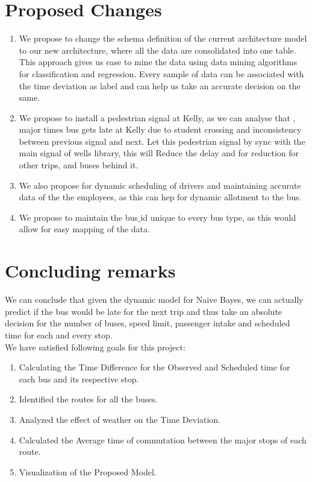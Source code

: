 \documentclass[12pt]{article}
\begin{document}
\section{Proposed Changes}
\begin{enumerate}
	\item We propose to change the schema definition of the current architecture model to our new architecture, where all the data are consolidated into one table. This approach gives us ease to mine the data using data mining algorithms for classification and regression. Every sample of data can be associated with the time deviation as label and can help us take an accurate decision on the same.
	
	\item We propose to install a pedestrian signal at Kelly, as we can analyse that , major times bus gets late at Kelly due to student crossing and inconsistency between previous signal and next. Let this pedestrian signal by sync with the main signal of wells library, this will 
	Reduce the delay and for reduction for other trips, and buses behind it.
	
	\item We also propose for dynamic scheduling of drivers and maintaining accurate data of the the employees, as this can hep for dynamic allotment to the bus.
	
	\item We propose to maintain the bus$\_$id unique to every bus type, as this would allow for easy mapping of the data.
\end{enumerate}

\section{Concluding remarks}
We can conclude that given the dynamic model for Naive Bayes, we can actually predict if the bus would be late for the next trip and thus take an absolute decision for the number of buses, speed limit, passenger intake and scheduled time for each and every stop.
\\We have satisfied following goals for this project:
\begin{enumerate}
	\item Calculating the Time Difference for the Observed and Scheduled time for each bus and its respective stop.
	\item Identified the routes for all the buses.
	\item Analyzed the effect of weather on the Time Deviation.
	\item Calculated the Average time of commutation between the major stops of each route.
	\item Visualization of the Proposed Model.
\end{enumerate}
\end{document}
